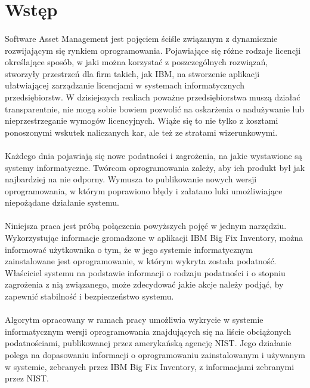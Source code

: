 \documentclass[a4paper,12pt,twoside]{article}
\begin{document}
\newpage
\section*{Wstęp}
\paragraph{}
    Software Asset Management jest pojęciem ściśle związanym z dynamicznie rozwijającym się rynkiem oprogramowania. Pojawiające się różne rodzaje licencji określające sposób, w jaki można korzystać z poszczególnych rozwiązań, stworzyły przestrzeń dla firm takich, jak IBM, na stworzenie aplikacji ułatwiającej zarządzanie licencjami w systemach informatycznych przedsiębiorstw. W dzisiejszych realiach poważne przedsiębiorstwa muszą działać transparentnie, nie mogą sobie bowiem pozwolić na oskarżenia o nadużywanie lub nieprzestrzeganie wymogów licencyjnych. Wiąże się to nie tylko z kosztami ponoszonymi wskutek naliczanych kar, ale też ze stratami wizerunkowymi.

    \paragraph{}
    Każdego dnia pojawiają się nowe podatności i zagrożenia, na jakie wystawione są systemy informatyczne. Twórcom oprogramowania zależy, aby ich produkt był jak najbardziej na nie odporny. Wymusza to publikowanie nowych wersji oprogramowania, w którym poprawiono błędy i załatano luki umożliwiające niepożądane działanie systemu.      

    \paragraph{}
    Niniejsza praca jest próbą połączenia powyższych pojęć w jednym narzędziu. Wykorzystując informacje gromadzone w aplikacji IBM Big Fix Inventory, można informować użytkownika o tym, że w jego systemie informatycznym zainstalowane jest oprogramowanie, w którym wykryta została podatność. Właściciel systemu na podstawie informacji o rodzaju podatności i o stopniu zagrożenia z nią związanego, może zdecydować jakie akcje należy podjąć, by zapewnić stabilność i bezpieczeństwo systemu.

    \paragraph{}
    Algorytm opracowany w ramach pracy umożliwia wykrycie w systemie informatycznym wersji oprogramowania znajdujących się na liście obciążonych podatnościami, publikowanej przez amerykańską agencję NIST. Jego działanie polega na dopasowaniu informacji o oprogramowaniu zainstalowanym i używanym w systemie, zebranych przez IBM Big Fix Inventory, z informacjami zebranymi przez NIST.    
    
\end{document}
